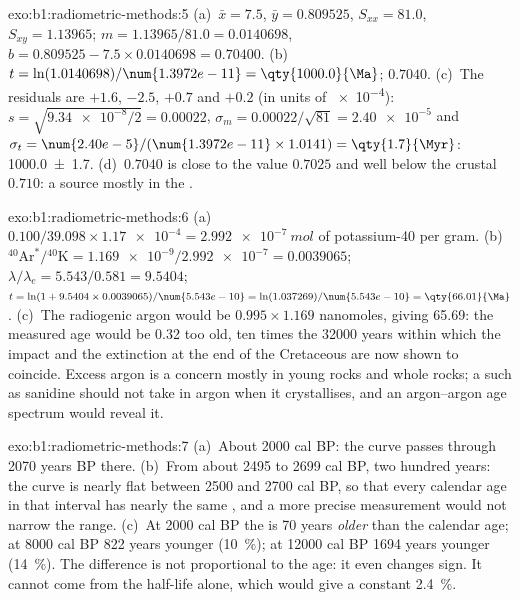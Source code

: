 \begin{solution}{exo:b1:radiometric-methods:5}
(a)~$\bar x = 7.5$, $\bar y = 0.809525$, $S_{xx} = 81.0$, $S_{xy} = 1.13965$;
$m = 1.13965/81.0 = 0.0140698$, $b = 0.809525 - 7.5 \times 0.0140698 = 0.70400$.
(b)~$t = \ln(1.0140698)/\num{1.3972e-11} = \qty{1000.0}{\Ma}$; 
$0.7040$. (c)~The residuals are $+1.6$, $-2.5$, $+0.7$ and $+0.2$ (in units of
\num{e-4}): $s = \sqrt{\num{9.34e-8}/2} = 0.00022$, $\sigma_m = 0.00022/\sqrt{81}
= \num{2.40e-5}$ and $\sigma_t = \num{2.40e-5}/(\num{1.3972e-11} \times 1.0141) =
\qty{1.7}{\Myr}$: \qty[uncertainty-mode=separate]{1000.0(17)}{\Ma}. (d)~$0.7040$
is close to the  value $0.7025$ and well below the crustal $0.710$: a source
mostly in the .
\end{solution}

\begin{solution}{exo:b1:radiometric-methods:6}
(a)~$0.100/39.098 \times \num{1.17e-4} = \qty{2.992e-7}{mol}$ of potassium-40 per
gram. (b)~${}^{40}\mathrm{Ar}^*/{}^{40}\mathrm{K} = \num{1.169e-9}/\num{2.992e-7}
= 0.0039065$; $\lambda/\lambda_e = 5.543/0.581 = 9.5404$; $t = \ln(1 + 9.5404
\times 0.0039065)/\num{5.543e-10} = \ln(1.037269)/\num{5.543e-10} =
\qty{66.01}{\Ma}$. (c)~The radiogenic argon would be $0.995 \times 1.169$
nanomoles, giving \qty{65.69}{\Ma}: the measured age would be \qty{0.32}{\Myr}
too old, ten times the \num{32000} years within which the impact and the
extinction at the end of the Cretaceous are now shown to coincide. Excess argon is a concern mostly in young rocks and whole rocks; a
 such as sanidine should not take in argon when it crystallises, and an
argon--argon age spectrum would reveal it.
\end{solution}

\begin{solution}{exo:b1:radiometric-methods:7}
(a)~About \num{2000} cal BP: the curve passes through \num{2070} years BP there.
(b)~From about \num{2495} to \num{2699} cal BP, two hundred years: the curve is
nearly flat between \num{2500} and \num{2700} cal BP, so that every calendar age
in that interval has nearly the same , and a more precise
measurement would not narrow the range. (c)~At \num{2000} cal BP the  is \num{70} years \emph{older} than the calendar age; at \num{8000} cal BP
\num{822} years younger (\qty{10}{\percent}); at \num{12000} cal BP \num{1694}
years younger (\qty{14}{\percent}). The difference is not proportional to the
age: it even changes sign. It cannot come from the half-life alone, which would
give a constant \qty{2.4}{\percent}.
\end{solution}


